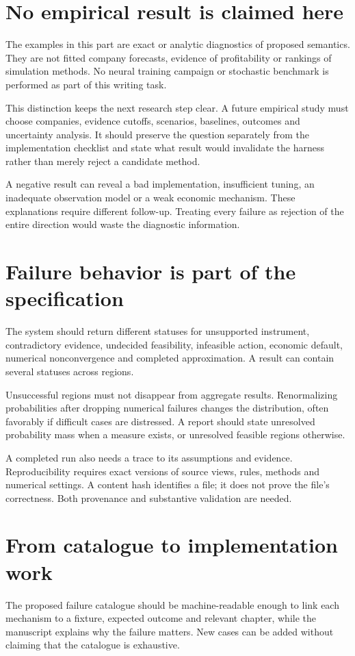 \section{No empirical result is claimed here}
The examples in this part are exact or analytic diagnostics of proposed semantics. They are not fitted company forecasts, evidence of profitability or rankings of simulation methods. No neural training campaign or stochastic benchmark is performed as part of this writing task.

This distinction keeps the next research step clear. A future empirical study must choose companies, evidence cutoffs, scenarios, baselines, outcomes and uncertainty analysis. It should preserve the question separately from the implementation checklist and state what result would invalidate the harness rather than merely reject a candidate method.

A negative result can reveal a bad implementation, insufficient tuning, an inadequate observation model or a weak economic mechanism. These explanations require different follow-up. Treating every failure as rejection of the entire direction would waste the diagnostic information.

\section{Failure behavior is part of the specification}
The system should return different statuses for unsupported instrument, contradictory evidence, undecided feasibility, infeasible action, economic default, numerical nonconvergence and completed approximation. A result can contain several statuses across regions.

Unsuccessful regions must not disappear from aggregate results. Renormalizing probabilities after dropping numerical failures changes the distribution, often favorably if difficult cases are distressed. A report should state unresolved probability mass when a measure exists, or unresolved feasible regions otherwise.

A completed run also needs a trace to its assumptions and evidence. Reproducibility requires exact versions of source views, rules, methods and numerical settings. A content hash identifies a file; it does not prove the file's correctness. Both provenance and substantive validation are needed.

\section{From catalogue to implementation work}
The proposed failure catalogue should be machine-readable enough to link each mechanism to a fixture, expected outcome and relevant chapter, while the manuscript explains why the failure matters. New cases can be added without claiming that the catalogue is exhaustive.

